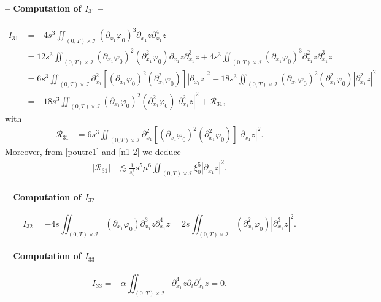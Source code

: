 \documentclass[a4paper, 12pt]{article}
\theoremstyle{plain}
\theoremstyle{definition}
\numberwithin{theorem}{section}
\numberwithin{equation}{section}
\begin{document}
{\paragraph{-- Computation of $I_{31}$ --}
\begin{align*}
I_{31}&=-4s^3\iint_{(0,T)\times\mathcal{I}}(\partial_{x_1}\varphi_0)^3\partial_{x_1}z\partial^4_{x_1}z\\
&=12s^3\iint_{(0,T)\times\mathcal{I}}(\partial_{x_1}\varphi_0)^2(\partial^2_{x_1}\varphi_0)\partial_{x_1}z\partial^3_{x_1}z+4s^3\iint_{(0,T)\times\mathcal{I}}(\partial_{x_1}\varphi_0)^3\partial^2_{x_1}z\partial^3_{x_1}z\\
&=6s^3\iint_{(0,T)\times\mathcal{I}}\partial_{x_1}^2[(\partial_{x_1}\varphi_0)^2(\partial^2_{x_1}\varphi_0)]|\partial_{x_1}z|^2-18s^3\iint_{(0,T)\times\mathcal{I}}(\partial_{x_1}\varphi_0)^2(\partial^2_{x_1}\varphi_0)|\partial_{x_1}^2z|^2\\
&=-18s^3\iint_{(0,T)\times\mathcal{I}}(\partial_{x_1}\varphi_0)^2(\partial^2_{x_1}\varphi_0)|\partial^2_{x_1}z|^2+\mathcal{R}_{31},
\end{align*}
with
\begin{align*}
\mathcal{R}_{31}&=6s^3\iint_{(0,T)\times\mathcal{I}}\partial_{x_1}^2[(\partial_{x_1}\varphi_0)^2(\partial^2_{x_1}\varphi_0)]|\partial_{x_1}z|^2.
\end{align*}
Moreover, from \eqref{poutre1} and \eqref{n1-2} we deduce
\begin{align}\label{EstR31}
|\mathcal{R}_{31}|&\lesssim \frac{1}{s_0^2}s^5\mu^6 \iint_{(0,T)\times\mathcal{I}}\xi_0^5|\partial_{x_1}z|^2.
\end{align}
\paragraph{-- Computation of $I_{32}$ --}
$$I_{32}=-4s\iint_{(0,T)\times\mathcal{I}}(\partial_{x_1}\varphi_0)\partial^3_{x_1}z\partial^4_{x_1}z=2s\iint_{(0,T)\times\mathcal{I}}(\partial^2_{x_1}\varphi_0)|\partial^3_{x_1}z|^2.$$
\paragraph{-- Computation of $I_{33}$ --}
$$I_{33}=-\alpha\iint_{(0,T)\times\mathcal{I}}\partial^4_{x_1}z \partial_t\partial^2_{x_1}z=0.$$
}
\end{document}
